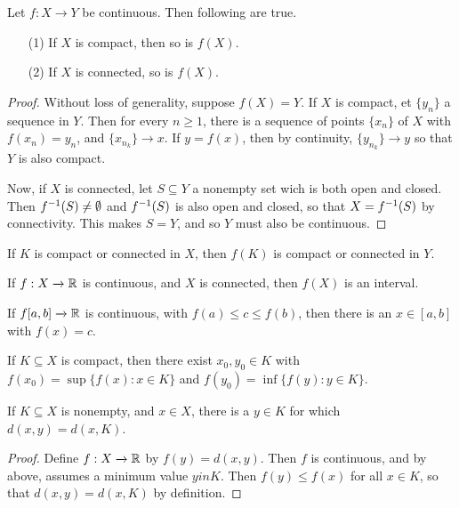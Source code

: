 \begin{theorem}\label{2.5.7}
    Let $f:X \xrightarrow{} Y$ be continuous. Then following are true.
    \begin{enumerate}
        \item[(1)] If $X$ is compact, then so is  $f(X)$.

        \item[(2)] If $X$ is connected, so is  $f(X)$.
    \end{enumerate}
\end{theorem}
\begin{proof}
    Without loss of generality, suppose $f(X)=Y$. If $X$ is compact, et
    $\{y_n\}$ a sequence in $Y$. Then for every  $n \geq 1$, there is a sequence
    of points  $\{x_n\}$ of $X$ with  $f(x_n)=y_n$, and $\{x_{n_k}\}
    \xrightarrow{} x$. If $y=f(x)$, then by continuity, $\{y_{n_k}\}
    \xrightarrow{} y$ so that $Y$ is also compact.

    Now, if  $X$ is connected, let  $S \subseteq Y$ a nonempty set wich is both
    open and closed. Then  $f^{-1}(S) \neq \emptyset$ and $f^{-1}(S)$ is also
    open and closed, so that $X=f^{-1}(S)$ by connectivity. This makes $S=Y$,
    and so  $Y$ must also be continuous.
\end{proof}
\begin{corollary}
    If $K$ is compact or connected in  $X$, then  $f(K)$ is compact or connected
    in $Y$.
\end{corollary}
\begin{corollary}
    If $f:X \xrightarrow{} \mathbb{R}$ is continuous, and $X$ is connected, then  $f(X)$
    is an interval.
\end{corollary}

\begin{theorem}\label{2.5.8}
    If $f[a,b] \xrightarrow{} \mathbb{R}$ is continuous, with $f(a) \leq c \leq f(b)$,
    then there is an $x \in [a,b]$ with $f(x)=c$.
\end{theorem}
\begin{corollary}
    If $K \subseteq X$ is compact, then there exist  $x_0,y_0 \in K$ with
    $f(x_0)=\sup{\{f(x) : x \in K\}}$ and $f(y_0)=\inf{\{f(y) : y \in K\}}$.
\end{corollary}
\begin{corollary}
    If $K \subseteq X$ is nonempty, and  $x \in X$, there is a  $y \in K$ for
    which $d(x,y)=d(x,K)$.
\end{corollary}
\begin{proof}
    Define $f:X \xrightarrow{} \mathbb{R}$ by $f(y)=d(x,y)$. Then $f$ is continuous, and
    by above, assumes a minimum value  $y in K$. Then $f(y) \leq f(x)$ for all
    $x \in K$, so that  $d(x,y)=d(x,K)$ by definition.
\end{proof}

